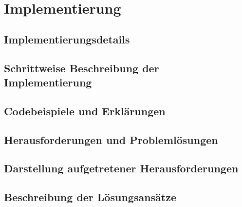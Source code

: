 \section{Implementierung}
\subsection[Implementierungsdetails]{Implementierungsdetails}

\subsection[Schrittweise Beschreibung der Implementierung]{Schrittweise Beschreibung der Implementierung}

\subsection[Codebeispiele und Erklärungen]{Codebeispiele und Erklärungen}


\subsection[Herausforderungen und Problemlösungen]{Herausforderungen und Problemlösungen}

\subsection[Darstellung aufgetretener Herausforderungen]{Darstellung aufgetretener Herausforderungen}

\subsection[Beschreibung der Lösungsansätze]{Beschreibung der Lösungsansätze}
